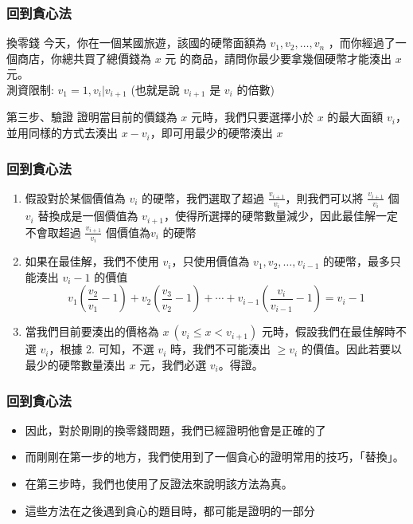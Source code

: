 \documentclass[aspectratio=169]{beamer}
\begin{document}
\begin{frame}
\frametitle{回到貪心法}
    \begin{block}{換零錢}
    今天，你在一個某國旅遊，該國的硬幣面額為 $v_1, v_2, \ldots, v_n$ ，而你經過了一個商店，你總共買了總價錢為 $x$ 元 的商品，請問你最少要拿幾個硬幣才能湊出 $x$ 元。 \\
    測資限制: $v_1 = 1, v_i | v_{i+1}$ (也就是說 $v_{i+1}$ 是 $v_i$ 的倍數)
    \end{block}
    
    \begin{alertblock}{第三步、驗證}
        證明當目前的價錢為 $x$ 元時，我們只要選擇小於 $x$ 的最大面額 $v_i$，並用同樣的方式去湊出 $x-v_i$，即可用最少的硬幣湊出 $x$
    \end{alertblock}
    
\end{frame}

\begin{frame}
\frametitle{回到貪心法}
    \begin{enumerate}
        \item<1-> 假設對於某個價值為 $v_i$ 的硬幣，我們選取了超過 $\frac{v_{i+1}}{v_i}$，則我們可以將 $\frac{v_{i+1}}{v_i}$ 個 $v_i$ 替換成是一個價值為 $v_{i+1}$，使得所選擇的硬幣數量減少，因此最佳解一定不會取超過 $\frac{v_{i+1}}{v_i}$ 個價值為$v_i$ 的硬幣
        \item<2-> 如果在最佳解，我們不使用 $v_i$，只使用價值為 $v_1, v_2, \ldots, v_{i-1}$ 的硬幣，最多只能湊出 $v_i-1$ 的價值
        $$v_1(\frac{v_2}{v_1}-1)+v_2(\frac{v_3}{v_2}-1)+\cdots+v_{i-1}(\frac{v_i}{v_{i-1}}-1) = v_i-1$$
        \item<3-> 當我們目前要湊出的價格為 $x \ (v_i \le x < v_{i+1}) $ 元時，假設我們在最佳解時不選 $v_i$，根據 2. 可知，不選 $v_i$ 時，我們不可能湊出 $\ge v_i$ 的價值。因此若要以最少的硬幣數量湊出 $x$ 元，我們必選 $v_i$。得證。
    \end{enumerate}
\end{frame}

\begin{frame}
\frametitle{回到貪心法}
    \begin{itemize}
        \item 因此，對於剛剛的換零錢問題，我們已經證明他會是正確的了
        \item 而剛剛在第一步的地方，我們使用到了一個貪心的證明常用的技巧，「替換」。
        \item 在第三步時，我們也使用了反證法來說明該方法為真。
        \item 這些方法在之後遇到貪心的題目時，都可能是證明的一部分
    \end{itemize}
\end{frame}
\end{document}
